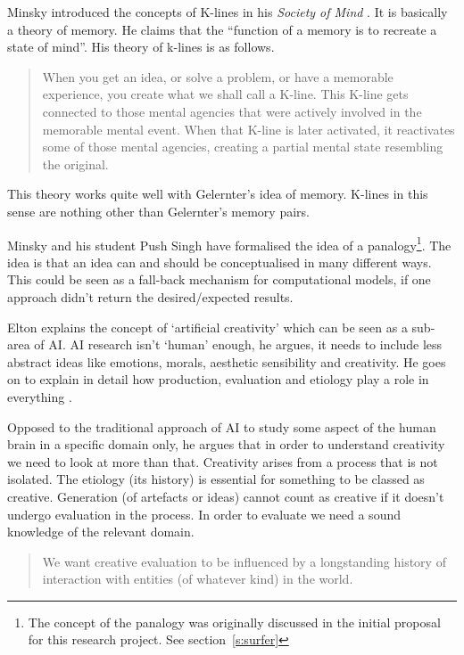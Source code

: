 \spirals

Minsky introduced the concepts of K-lines in his \textit{Society of Mind} \autocite*{Minsky1980, Minsky1988}. It is basically a theory of memory. He claims that the ``function of a memory is to recreate a state of mind''. His theory of k-lines is as follows.

\begin{quotation}
  When you get an idea, or solve a problem, or have a memorable experience, you create what we shall call a K-line. This K-line gets connected to those mental agencies that were actively involved in the memorable mental event. When that K-line is later activated, it reactivates some of those mental agencies, creating a partial mental state resembling the original. 
\end{quotation}

This theory works quite well with Gelernter's idea of memory. K-lines in this sense are nothing other than Gelernter's memory pairs.

Minsky and his student Push Singh have formalised the idea of a panalogy\footnote{The concept of the panalogy was originally discussed in the initial proposal for this research project. See section~\ref{s:surfer}}. The idea is that an idea can and should be conceptualised in many different ways. This could be seen as a fall-back mechanism for computational models, if one approach didn't return the desired/expected results.

\spirals

Elton explains the concept of `artificial creativity' which can be seen as a sub-area of \ac{AI}. \ac{AI} research isn't `human' enough, he argues, it needs to include less abstract ideas like emotions, morals, aesthetic sensibility and creativity. He goes on to explain in detail how production, evaluation and etiology play a role in everything \autocite{Elton1995}.

Opposed to the traditional approach of \ac{AI} to study some aspect of the human brain in a specific domain only, he argues that in order to understand creativity we need to look at more than that. Creativity arises from a process that is not isolated. The etiology (its history) is essential for something to be classed as creative. Generation (of artefacts or ideas) cannot count as creative if it doesn't undergo evaluation in the process. In order to evaluate we need a sound knowledge of the relevant domain. 

\begin{quotation}
  We want creative evaluation to be influenced by a longstanding history of interaction with entities (of whatever kind) in the world. 
\end{quotation}
  
